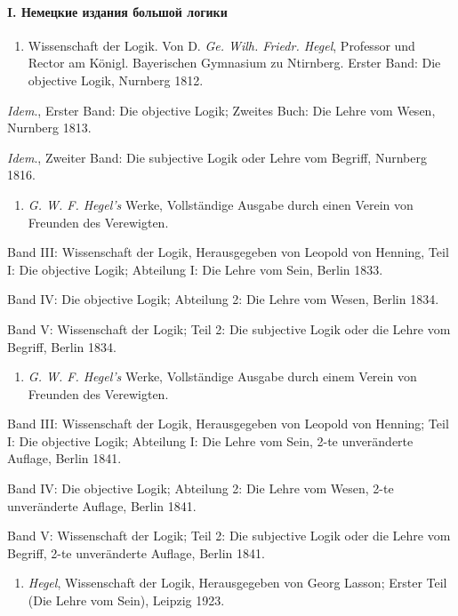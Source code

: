 \documentclass[twoside]{article}
\begin{document}
\paragraph[I. Немецкие издания большой логики ]
{I. Немецкие издания большой логики }

\begin{enumerate}
\item 
Wissenschaft der Logik. Von D. {\em Ge. Wilh. Friedr. Hegel}, 
Professor und Rector am Königl. Bayerischen Gymnasium zu Ntirnberg. 
Erster Band: Die objective Logik, Nurnberg 1812.
\end{enumerate}

{\em Idem}., Erster Band: Die objective Logik; Zweites Buch: Die Lehre 
vom Wesen, Nurnberg 1813.

{\em Idem}., Zweiter Band: Die subjective Logik oder Lehre vom Begriff, 
Nurnberg 1816.

\begin{enumerate}
\item 
{\em G. W. F. Hegel's} Werke, Vollständige Ausgabe durch einen Verein von 
Freunden des Verewigten.
\end{enumerate}

Band III: Wissenschaft der Logik, Herausgegeben von
Leopold von Henning, Teil I: Die objective Logik; Abteilung I: Die Lehre
vom Sein, Berlin 1833.

Band IV: Die objective Logik; Abteilung 2: Die Lehre vom Wesen, Berlin 1834.

Band V: Wissenschaft der Logik; Teil 2: Die subjective Logik oder die Lehre 
vom Begriff, Berlin 1834.

\begin{enumerate}
\item 
{\em G. W. F. Hegel's} Werke, Vollständige Ausgabe durch einem Verein von 
Freunden des Verewigten.
\end{enumerate}

Band III: Wissenschaft der Logik, Herausgegeben von Leopold von Henning; 
Teil I: Die objective Logik; Abteilung I: Die Lehre vom Sein, 2-te 
unveränderte Auflage, Berlin 1841.

Band IV: Die objective Logik; Abteilung 2: Die Lehre vom Wesen, 2-te 
unveränderte Auflage, Berlin 1841.

Band V: Wissenschaft der Logik; Teil 2: Die subjective Logik oder die Lehre 
vom Begriff, 2-te unveränderte Auflage, Berlin 1841.


\begin{enumerate}
\item 
{\em Hegel}, Wissenschaft der Logik, Herausgegeben von Georg Lasson; 
Erster Teil (Die Lehre vom Sein), Leipzig 1923.
\end{enumerate}
\end{document}
